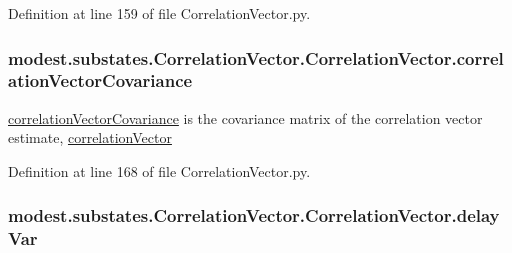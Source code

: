 Definition at line 159 of file Correlation\+Vector.\+py.

\subsubsection[{\texorpdfstring{correlation\+Vector\+Covariance}{correlationVectorCovariance}}]{\setlength{\rightskip}{0pt plus 5cm}modest.\+substates.\+Correlation\+Vector.\+Correlation\+Vector.\+correlation\+Vector\+Covariance}\hypertarget{classmodest_1_1substates_1_1CorrelationVector_1_1CorrelationVector_a41fd280bad20bc266d05d51d40a161a9}{}\label{classmodest_1_1substates_1_1CorrelationVector_1_1CorrelationVector_a41fd280bad20bc266d05d51d40a161a9}


\hyperlink{classmodest_1_1substates_1_1CorrelationVector_1_1CorrelationVector_a41fd280bad20bc266d05d51d40a161a9}{correlation\+Vector\+Covariance} is the covariance matrix of the correlation vector estimate, \hyperlink{classmodest_1_1substates_1_1CorrelationVector_1_1CorrelationVector_a79191f74fabdb5dbea025f2bf3c4c2b2}{correlation\+Vector} 



Definition at line 168 of file Correlation\+Vector.\+py.

\subsubsection[{\texorpdfstring{delay\+Var}{delayVar}}]{\setlength{\rightskip}{0pt plus 5cm}modest.\+substates.\+Correlation\+Vector.\+Correlation\+Vector.\+delay\+Var}\hypertarget{classmodest_1_1substates_1_1CorrelationVector_1_1CorrelationVector_af26efaaeaeff4ef313b8f1654559787a}{}\label{classmodest_1_1substates_1_1CorrelationVector_1_1CorrelationVector_af26efaaeaeff4ef313b8f1654559787a}


